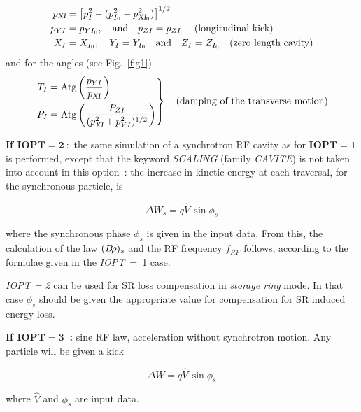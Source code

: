 { \begin{align*}
	 p_{\textsl{XI}} 
	      & = \left[p^2_I-(p^2_{I_0}-p^2_{\textsl{XI}_0}) \right]^{1/2} \\
	p_{YI} & = p_{YI_0},\quad \text{and} \quad  p_{ZI}= p_{ZI_0} \quad\text{(longitudinal  kick)} \\ 
	X_I &  = X_{I_0},\quad Y_I=Y_{I_0}\quad  \text{and} 
	        \quad Z_I=Z_{I_0} \quad\text{(zero  length cavity)}   
 \end{align*}
%
and for the angles (see Fig.~\ref{fig1})  
%
\begin{equation*}
	\left. 
	\begin{aligned}
		T_I & =  \text{Atg} \left( \dfrac{p_{YI}}{ p_{\textsl{XI}}} \right) \\
		P_I &  =  \text{Atg} \left(\dfrac{P_{ZI}}{(p^2_{\textsl{XI}}+p^2_{YI})^{1/2}} \right) 
	\end{aligned}
	 \right\rbrace \quad \text{(damping  of the  transverse  motion)}
\end{equation*}  

\noindent\textbf{If $\mathbf{IOPT  =  2~:}$} the same simulation of a synchrotron RF cavity 
as for $\mathbf{IOPT  =  1}$ is performed, except that the keyword 
\textsl{SCALING} (family \textsl{CAVITE}) is not taken into 
account in this option~: the increase in kinetic energy at each traversal, 
for the synchronous particle, is

$$ \Delta W_s= q\hat  V \,\sin\phi_ s $$

\noindent where the synchronous phase $ \phi_ s $ is given in the input data.
From this, the calculation of the law $ (B\!\rho )_s $ and the RF frequency 
$f_{RF} $ follows, according to the formulae given in the \mbox{\textsl{IOPT}  =  1} case. 

\medskip

\noindent \textsl{IOPT  =  2} can be used for SR loss compensation in \textsl{storage ring} mode. In that case 
$ \phi_ s $ should be given  the appropriate value for compensation for SR induced energy loss. 

\bigskip

\noindent\textbf{If $\mathbf{IOPT  =  3}$~:} sine RF law, acceleration without synchrotron motion. 
Any particle will be given a kick

$$ \Delta W = q\hat  V\, \sin\phi_ s $$

\noindent where $ \hat  V $ and $ \phi_ s $ are input data.  

\bigskip

}
